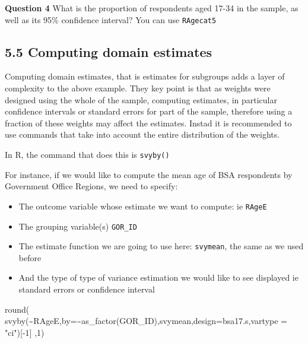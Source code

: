 \documentclass[
  14,
  a4paper,
  DIV=11,
  numbers=noendperiod]{scrartcl}
\newenvironment{Shaded}{\begin{snugshade}}{\end{snugshade}}
\newcommand{\AttributeTok}[1]{\textcolor[rgb]{0.40,0.45,0.13}{#1}}
\newcommand{\DecValTok}[1]{\textcolor[rgb]{0.68,0.00,0.00}{#1}}
\newcommand{\FunctionTok}[1]{\textcolor[rgb]{0.28,0.35,0.67}{#1}}
\newcommand{\NormalTok}[1]{\textcolor[rgb]{0.00,0.23,0.31}{#1}}
\newcommand{\SpecialCharTok}[1]{\textcolor[rgb]{0.37,0.37,0.37}{#1}}
\newcommand{\StringTok}[1]{\textcolor[rgb]{0.13,0.47,0.30}{#1}}
\providecommand{\tightlist}{%
  \setlength{\itemsep}{0pt}\setlength{\parskip}{0pt}}\usepackage{longtable,booktabs,array}
\begin{document}
\textbf{Question 4} What is the proportion of respondents aged 17-34 in
the sample, as well as its 95\% confidence interval? You can use
\texttt{RAgecat5}

\hypertarget{computing-domain-estimates}{%
\subsection{5.5 Computing domain
estimates}\label{computing-domain-estimates}}

Computing domain estimates, that is estimates for subgroups adds a layer
of complexity to the above example. They key point is that as weights
were designed using the whole of the sample, computing estimates, in
particular confidence intervals or standard errors for part of the
sample, therefore using a fraction of these weights may affect the
estimates. Instad it is recommended to use commands that take into
account the entire distribution of the weights.

In R, the command that does this is \texttt{svyby()}

For instance, if we would like to compute the mean age of BSA
respondents by Government Office Regions, we need to specify:

\begin{itemize}
\tightlist
\item
  The outcome variable whose estimate we want to compute: ie
  \texttt{RAgeE}
\item
  The grouping variable(s) \texttt{GOR\_ID}
\item
  The estimate function we are going to use here: \texttt{svymean}, the
  same as we used before
\item
  And the type of type of variance estimation we would like to see
  displayed ie standard errors or confidence interval
\end{itemize}

\begin{Shaded}
\begin{Highlighting}[]
\FunctionTok{round}\NormalTok{(}
      \FunctionTok{svyby}\NormalTok{(}\SpecialCharTok{\textasciitilde{}}\NormalTok{RAgeE,}\AttributeTok{by=}\SpecialCharTok{\textasciitilde{}}\FunctionTok{as\_factor}\NormalTok{(GOR\_ID),svymean,}\AttributeTok{design=}\NormalTok{bsa17.s,}\AttributeTok{vartype =} \StringTok{"ci"}\NormalTok{)[}\SpecialCharTok{{-}}\DecValTok{1}\NormalTok{]}
\NormalTok{      ,}\DecValTok{1}\NormalTok{)}
\end{Highlighting}
\end{Shaded}
\end{document}

